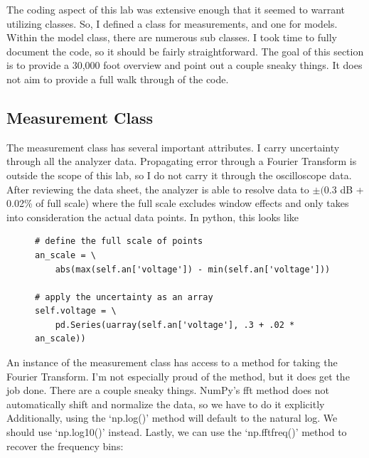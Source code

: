 \documentclass{article}
\begin{document}
The coding aspect of this lab was extensive enough that it seemed
to warrant utilizing classes. So, I defined a class for measurements, and one
for models. Within the model class, there are numerous sub classes. I took time
to fully document the code, so it should be fairly straightforward. The goal of
this section is to provide a 30,000 foot overview and point out a couple sneaky
things. It does not aim to provide a full walk through of the code.


\subsection{Measurement Class}%
\label{sub:measurement_class}

The measurement class has several important attributes. I carry uncertainty
through all the analyzer data. Propagating error through a Fourier Transform is
outside the scope of this lab, so I do not carry it through the oscilloscope
data. After reviewing the data sheet, the analyzer is able to resolve data to
$\pm($0.3 dB + 0.02\% of full scale) where the full scale excludes window
effects and only takes into consideration the actual data points. In python,
this looks like

\begin{figure}[H]
\centering
\begin{minipage}{1\textwidth}
\begin{tcolorbox}
\begin{verbatim}
# define the full scale of points
an_scale = \
    abs(max(self.an['voltage']) - min(self.an['voltage']))

# apply the uncertainty as an array
self.voltage = \
    pd.Series(uarray(self.an['voltage'], .3 + .02 * an_scale))
\end{verbatim}
\end{tcolorbox}
\end{minipage}
\end{figure}

An instance of the measurement class has access to a method for taking the
Fourier Transform. I'm not especially proud of the method, but it does get the
job done. There are a couple sneaky things. NumPy's fft method does not
automatically shift and normalize the data, so we have to do it explicitly
Additionally, using the `np.log()' method will default to the natural log. We
should use `np.log10()' instead. Lastly, we can use the `np.fftfreq()' method
to recover the frequency bins:
\end{document}
